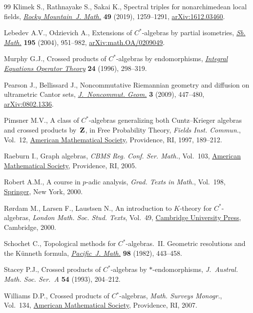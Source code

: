 \begin{thebibliography}{99}
Klimek S., Rathnayake S., Sakai K., Spectral triples for nonarchimedean local
 fields, \href{https://doi.org/10.1216/RMJ-2019-49-4-1259}{\textit{Rocky
 Mountain~J. Math.}} \textbf{49} (2019), 1259--1291,
 \href{http://arxiv.org/abs/1612.03460}{arXiv:1612.03460}.

Lebedev A.V., Odzievich A., Extensions of {$C^\ast$}-algebras by partial
 isometries,
 \href{https://doi.org/10.1070/SM2004v195n07ABEH000834}{\textit{Sb. Math.}}
 \textbf{195} (2004), 951--982,
 \href{http://arxiv.org/abs/math.OA/0209049}{arXiv:math.OA/0209049}.

Murphy G.J., Crossed products of {$C^*$}-algebras by endomorphisms,
 \href{https://doi.org/10.1007/BF01204603}{\textit{Integral Equations Operator
 Theory}} \textbf{24} (1996), 298--319.

Pearson J., Bellissard J., Noncommutative {R}iemannian geometry and diffusion
 on ultrametric {C}antor sets,
 \href{https://doi.org/10.4171/JNCG/43}{\textit{J.~Noncommut. Geom.}}
 \textbf{3} (2009), 447--480,
 \href{http://arxiv.org/abs/0802.1336}{arXiv:0802.1336}.

Pimsner M.V., A class of {$C^*$}-algebras generalizing both {C}untz--{K}rieger
 algebras and crossed products by~{${\bf Z}$}, in Free {P}robability {T}heory,
 \textit{Fields Inst. Commun.}, Vol.~12,
 \href{https://doi.org/10.1090/fic/012/08}{American Mathematical Society},
 Providence, RI, 1997, 189--212.

Raeburn I., Graph algebras, \textit{CBMS Reg. Conf. Ser. Math.}, Vol.~103,
 \href{https://doi.org/10.1090/cbms/103}{American Mathematical Society},
 Providence, RI, 2005.

Robert A.M., A course in {$p$}-adic analysis, \textit{Grad. Texts in Math.},
 Vol.~198, \href{https://doi.org/10.1007/978-1-4757-3254-2}{Springer}, New
 York, 2000.

R{\o}rdam M., Larsen F., Laustsen N., An introduction to {$K$}-theory for
 {$C^*$}-algebras, \textit{London Math. Soc. Stud. Texts}, Vol.~49,
 \href{https://doi.org/10.1017/CBO9780511623806}{Cambridge University Press},
 Cambridge, 2000.

Schochet C., Topological methods for {$C^{\ast} $}-algebras.~{II}. {G}eometric
 resolutions and the {K}\"unneth formula,
 \href{https://doi.org/10.2140/pjm.1982.98.443}{\textit{Pacific~J. Math.}}
 \textbf{98} (1982), 443--458.

Stacey P.J., Crossed products of {$C^\ast$}-algebras by {$\ast$}-endomorphisms,
 \textit{J.~Austral. Math. Soc. Ser.~A} \textbf{54} (1993), 204--212.

Williams D.P., Crossed products of {$C{^\ast}$}-algebras, \textit{Math. Surveys Monogr.}, Vol.~134,
 \href{https://doi.org/10.1090/surv/134}{American Mathematical Society},
 Providence, RI, 2007.

\end{thebibliography}
